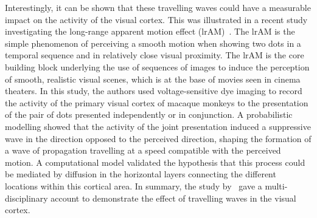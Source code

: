 \documentclass[brainsci, %
               review,accept,pdftex,moreauthors
               ]{Definitions/mdpi}
\begin{document}
Interestingly, it can be shown that these travelling waves could have a measurable impact on the activity of the visual cortex. This was illustrated in a recent study investigating the long-range apparent motion effect (lrAM)~\citep{chemla_suppressive_2019}. The lrAM is the simple phenomenon of perceiving a smooth motion when showing two dots in a temporal sequence and in relatively close visual proximity. The lrAM is the core building block underlying the use of sequences of images to induce the perception of smooth, realistic visual scenes, which is at the base of movies seen in cinema theaters. In this study, the authors used voltage-sensitive dye imaging to record the activity of the primary visual cortex of macaque monkeys to the presentation of the pair of dots presented independently or in conjunction. A probabilistic modelling showed that the activity of the joint presentation induced a suppressive wave in the direction opposed to the perceived direction, shaping the formation of a wave of propagation travelling at a speed compatible with the perceived motion. A computational model validated the hypothesis that this process could be mediated by diffusion in the horizontal layers connecting the different locations within this cortical area. In summary, the study by~\citet{chemla_suppressive_2019} gave a multi-disciplinary account to demonstrate the effect of travelling waves in the visual cortex.
%
%
\end{document}
